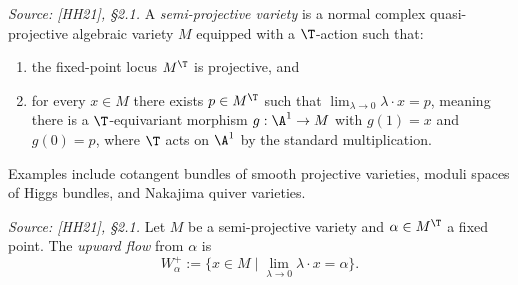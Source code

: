 \begin{definition}
  \label{def:semi_proj_variety}
  \uses{}
  \textit{Source: [HH21], §2.1.}
  A \emph{semi-projective variety} is a normal complex quasi-projective algebraic variety \(M\)
  equipped with a \(\T\)-action such that:
  \begin{enumerate}
    \item the fixed-point locus \(M^{\T}\) is projective, and
    \item for every \(x \in M\) there exists \(p \in M^{\T}\) such that
          \(\lim_{\lambda \to 0} \lambda \cdot x = p\), meaning there is a \(\T\)-equivariant
          morphism \(g : \A^1 \to M\) with \(g(1) = x\) and \(g(0) = p\), where \(\T\) acts on
          \(\A^1\) by the standard multiplication.
  \end{enumerate}
  Examples include cotangent bundles of smooth projective varieties, moduli spaces of Higgs
  bundles, and Nakajima quiver varieties.
\end{definition}

\begin{definition}
  \label{def:upward_flow}
  \textit{Source: [HH21], §2.1.}
  Let \(M\) be a semi-projective variety and \(\alpha \in M^{\T}\) a fixed point.  The
  \emph{upward flow} from \(\alpha\) is
  \[
    W^+_\alpha := \{ x \in M \mid \lim_{\lambda \to 0} \lambda \cdot x = \alpha \}.
  \]
\end{definition}

